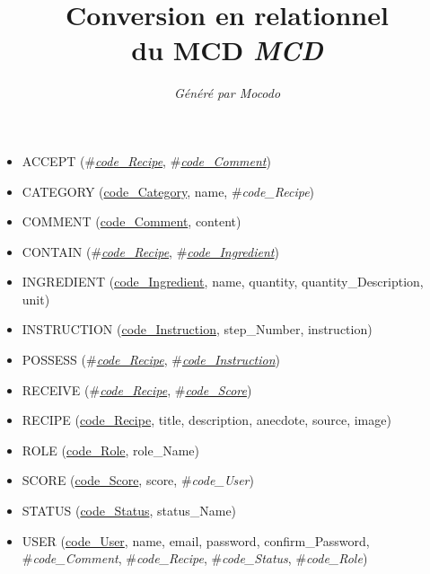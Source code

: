 \documentclass[a4paper]{article}
\title{Conversion en relationnel\\du MCD \emph{MCD}}
\author{\emph{Généré par Mocodo}}
\newcommand{\relat}[1]{\textsc{#1}}
\newcommand{\attr}[1]{#1}
\newcommand{\prim}[1]{\uline{#1}}
\newcommand{\foreign}[1]{\#\textsl{#1}}
\begin{document}
\maketitle

\begin{itemize}
  \item \relat{ACCEPT} (\foreign{\prim{code\_Recipe}}, \foreign{\prim{code\_Comment}})
  \item \relat{CATEGORY} (\prim{code\_Category}, \attr{name}, \foreign{code\_Recipe})
  \item \relat{COMMENT} (\prim{code\_Comment}, \attr{content})
  \item \relat{CONTAIN} (\foreign{\prim{code\_Recipe}}, \foreign{\prim{code\_Ingredient}})
  \item \relat{INGREDIENT} (\prim{code\_Ingredient}, \attr{name}, \attr{quantity}, \attr{quantity\_Description}, \attr{unit})
  \item \relat{INSTRUCTION} (\prim{code\_Instruction}, \attr{step\_Number}, \attr{instruction})
  \item \relat{POSSESS} (\foreign{\prim{code\_Recipe}}, \foreign{\prim{code\_Instruction}})
  \item \relat{RECEIVE} (\foreign{\prim{code\_Recipe}}, \foreign{\prim{code\_Score}})
  \item \relat{RECIPE} (\prim{code\_Recipe}, \attr{title}, \attr{description}, \attr{anecdote}, \attr{source}, \attr{image})
  \item \relat{ROLE} (\prim{code\_Role}, \attr{role\_Name})
  \item \relat{SCORE} (\prim{code\_Score}, \attr{score}, \foreign{code\_User})
  \item \relat{STATUS} (\prim{code\_Status}, \attr{status\_Name})
  \item \relat{USER} (\prim{code\_User}, \attr{name}, \attr{email}, \attr{password}, \attr{confirm\_Password}, \foreign{code\_Comment}, \foreign{code\_Recipe}, \foreign{code\_Status}, \foreign{code\_Role})
\end{itemize}
\end{document}
